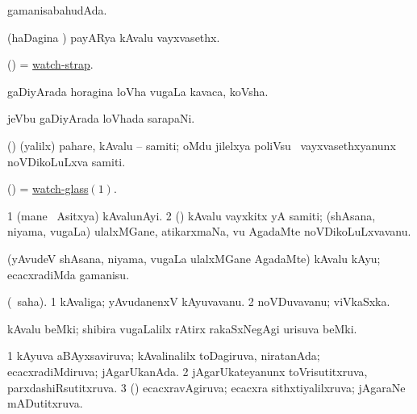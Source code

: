 \bentry
{} 
\gl{\gu}
\expl{}
\bmng
gamanisabahudAda. 
\emng
\eentry

\bentry
{} 
\gl{\nA}
\expl{}
\bmng
(haDagina \vi) payARya kAvalu vayxvasethx. 
\emng
\eentry

\bentry
{} 
\gl{\nA}
\expl{}
\bmng
(\ame) = \hyperlink{watch-strap}{watch-strap}. 
\emng
\eentry

\bentry
{} 
\gl{\nA}
\expl{}
\bmng
gaDiyArada horagina loVha \mo vugaLa kavaca, koVsha. 
\emng
\eentry

\bentry
{} 
\gl{\nA}
\expl{}
\bmng
jeVbu gaDiyArada loVhada sarapaNi. 
\emng
\eentry

\bentry
{} 
\gl{\nA}
\expl{}
\bmng
(\ca) (\UK yalilx) pahare, kAvalu -- samiti; oMdu jilelxya poliVsu \mo\ vayxvasethxyanunx noVDikoLuLxva samiti. 
\emng
\eentry

\bentry
{} 
\gl{\nA}
\expl{}
\bmng
(\ame) = \hyperlink{watch-glass}{watch-glass\((1)\)}. 
\emng
\eentry

\bentry
{} 
\gl{\nA}
\expl{}
\bmng
\bnum
\num{1} (mane \mo\ Asitxya) kAvalunAyi. 
\num{2} (\rUpa) kAvalu vayxkitx yA samiti; (shAsana, niyama, \mo vugaLa) ulalxMGane, atikarxmaNa, \mo vu AgadaMte noVDikoLuLxvavanu. 
\enum
\emng
\eentry

\bentry
{} 
\gl{\sakirx}
\bmng
(yAvudeV shAsana, niyama, \mo vugaLa ulalxMGane AgadaMte) kAvalu kAyu; ecacxradiMda gamanisu. 
\emng
\eentry

\bentry
{} 
\gl{\nA}
\expl{}
\bmng
(\saupa\ saha). 
\bnum
\num{1} kAvaliga; yAvudanenxV kAyuvavanu. 
\num{2} noVDuvavanu; viVkaSxka. 
\enum
\emng
\eentry

\bentry
{} 
\gl{\nA}
\expl{}
\bmng
kAvalu beMki; shibira \mo vugaLalilx rAtirx rakaSxNegAgi urisuva beMki. 
\emng
\eentry

\bentry
{} 
\gl{\gu}
\expl{}
\bmng
\bnum
\num{1} kAyuva aBAyxsaviruva; kAvalinalilx toDagiruva, niratanAda; ecacxradiMdiruva; jAgarUkanAda. 
\num{2} jAgarUkateyanunx toVrisutitxruva, parxdashiRsutitxruva. 
\num{3} (\pArxparx) ecacxravAgiruva; ecacxra sithxtiyalilxruva; jAgaraNe mADutitxruva. 
\enum
\emng
\eentry

